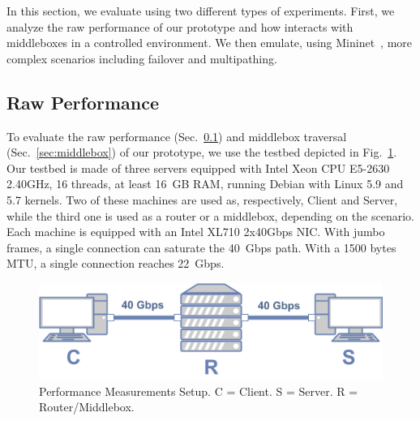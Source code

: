 
In this section, we evaluate \tcpls using two different types of experiments.
First, we analyze the raw performance of our \tcpls prototype and how \tcpls interacts with middleboxes in a controlled environment. We then emulate, using Mininet~\cite{handigol2012reproducible}, more complex scenarios including failover and multipathing.






\subsection{Raw Performance} \label{sec:perf}

To evaluate the raw performance (Sec.~\ref{sec:perf}) and middlebox traversal
(Sec.~\ref{sec:middlebox}) of our \tcpls prototype, we use the testbed depicted in Fig.~\ref{fig:perf_testbed}. Our testbed is made of three servers equipped with Intel Xeon CPU E5-2630 2.40GHz, 16 threads, at least 16~GB RAM, running Debian with Linux 5.9 and 5.7 kernels. Two of these machines are used as, respectively, Client and Server, while the third one is used as a router or a middlebox, depending on the scenario. Each machine is equipped with an Intel XL710 2x40Gbps NIC. With jumbo frames, a single \tcp connection can saturate the 40~Gbps path. With a 1500 bytes MTU, a single connection reaches 22~Gbps.

\begin{figure}[!t]
  \begin{center}
    \includegraphics[width=.7\columnwidth]{figures/testbed.png}
  \end{center}
  \vspace{-0.5cm}
  \caption{Performance Measurements Setup. C = Client. S = Server. R = Router/Middlebox.}
  \label{fig:perf_testbed}
\end{figure}



